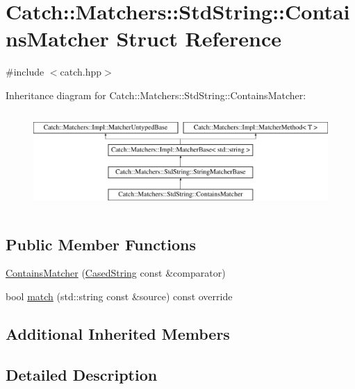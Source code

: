\hypertarget{struct_catch_1_1_matchers_1_1_std_string_1_1_contains_matcher}{}\section{Catch\+:\+:Matchers\+:\+:Std\+String\+:\+:Contains\+Matcher Struct Reference}
\label{struct_catch_1_1_matchers_1_1_std_string_1_1_contains_matcher}


{\ttfamily \#include $<$catch.\+hpp$>$}

Inheritance diagram for Catch\+:\+:Matchers\+:\+:Std\+String\+:\+:Contains\+Matcher\+:\begin{figure}[H]
\begin{center}
\leavevmode
\includegraphics[height=3.758389cm]{struct_catch_1_1_matchers_1_1_std_string_1_1_contains_matcher}
\end{center}
\end{figure}
\subsection*{Public Member Functions}
\begin{DoxyCompactItemize}
\item 
\mbox{\hyperlink{struct_catch_1_1_matchers_1_1_std_string_1_1_contains_matcher_acc892883c8409e34b28c9b39d4ef1fe3}{Contains\+Matcher}} (\mbox{\hyperlink{struct_catch_1_1_matchers_1_1_std_string_1_1_cased_string}{Cased\+String}} const \&comparator)
\item 
bool \mbox{\hyperlink{struct_catch_1_1_matchers_1_1_std_string_1_1_contains_matcher_a630628b234b037be83fe587081a80b53}{match}} (std\+::string const \&source) const override
\end{DoxyCompactItemize}
\subsection*{Additional Inherited Members}


\subsection{Detailed Description}


